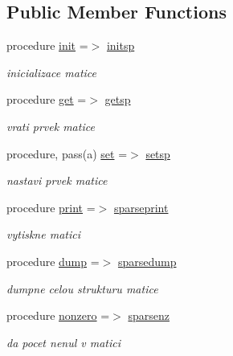 \subsection*{\-Public \-Member \-Functions}
\begin{DoxyCompactItemize}
\item 
procedure \hyperlink{structmtx_1_1smtx_aad1907a959bc0080ac4b364d6b2a17af}{init} =$>$ \hyperlink{classmtx_a80356982f18920eb884fc3d702f8ab7d}{initsp}
\begin{DoxyCompactList}\small\item\em inicializace matice \end{DoxyCompactList}\item 
procedure \hyperlink{structmtx_1_1smtx_ad099bd73ffe67c9c01ac973e0cbccf8a}{get} =$>$ \hyperlink{classmtx_ad554ec86f71c2382069ededfe0ce5b8f}{getsp}
\begin{DoxyCompactList}\small\item\em vrati prvek matice \end{DoxyCompactList}\item 
procedure, pass(a) \hyperlink{structmtx_1_1smtx_a7cd1a50472a77e6b3894c633e676bd35}{set} =$>$ \hyperlink{classmtx_adf89a3418cd4c27c6d678b03bdcb9e12}{setsp}
\begin{DoxyCompactList}\small\item\em nastavi prvek matice \end{DoxyCompactList}\item 
procedure \hyperlink{structmtx_1_1smtx_a3977bc695c6286962667d92261ee7ac2}{print} =$>$ \hyperlink{classmtx_ac13cd002efa96de601cc9439598ecedb}{sparseprint}
\begin{DoxyCompactList}\small\item\em vytiskne matici \end{DoxyCompactList}\item 
procedure \hyperlink{structmtx_1_1smtx_ac7863d852b3115cf545f7ed8356be3fc}{dump} =$>$ \hyperlink{classmtx_ade6ff684a4964e220554d2e1dc9cb846}{sparsedump}
\begin{DoxyCompactList}\small\item\em dumpne celou strukturu matice \end{DoxyCompactList}\item 
procedure \hyperlink{structmtx_1_1smtx_a6f111e4bbdebc5c728e9064be2164b65}{nonzero} =$>$ \hyperlink{classmtx_a26863ad7b18a9d30bfc146bc494bcb48}{sparsenz}
\begin{DoxyCompactList}\small\item\em da pocet nenul v matici \end{DoxyCompactList}\item 

\end{DoxyCompactItemize}
